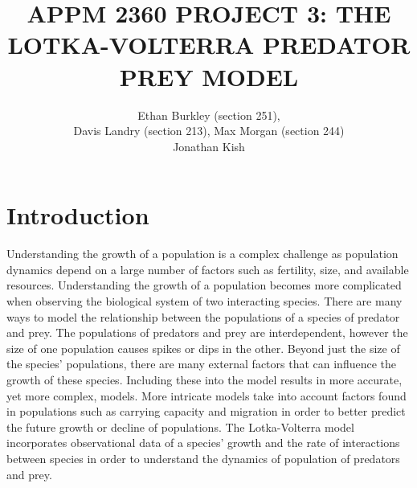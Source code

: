 \documentclass[12pt]{article}   %
\theoremstyle{definition}
\numberwithin{equation}{section}
\begin{document}
\parskip10pt
\parindent0pt
\baselineskip15pt


\title{APPM 2360 PROJECT 3: THE LOTKA-VOLTERRA PREDATOR PREY MODEL}
\author{Ethan Burkley (section 251), \\ Davis Landry (section 213), Max Morgan (section 244) \\ Jonathan Kish}


\pagestyle{fancy}
\renewcommand{\sectionmark}[1]{\markright{#1}{}}

\fancyhf{}

\rhead{\fancyplain{}{\thepage}} %
\lhead{\fancyplain{}{\rightmark }} %

\maketitle

\newpage
{}
\setcounter{page}{2}

\section{Introduction} \label{APPM2360proj01sec01}
\quad Understanding the growth of a population is a complex challenge as population dynamics depend on a large number of factors such as fertility, size, and available resources. Understanding the growth of a population becomes more complicated when observing the biological system of two interacting species. There are many ways to model the relationship between the populations of a species of predator and prey. The populations of predators and prey are interdependent, however the size of one population causes spikes or dips in the other. Beyond just the size of the species' populations, there are many external factors that can influence the growth of these species. Including these into the model results in more accurate, yet more complex, models. More intricate models take into account factors found in populations such as carrying capacity and migration in order to better predict the future growth or decline of populations. The Lotka-Volterra model incorporates observational data of a species' growth and the rate of interactions between species in order to understand the dynamics of population of predators and prey. 

\setcounter{page}{1}
\end{document}

